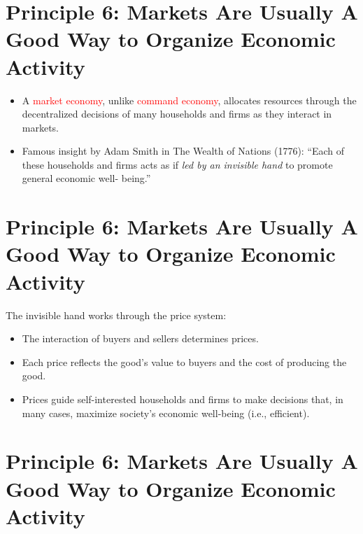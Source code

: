 \documentclass[
]{book}
\begin{document}
\hypertarget{principle-6-markets-are-usually-a-good-way-to-organize-economic-activity-1}{%
\section{Principle 6: Markets Are Usually A Good Way to Organize Economic Activity}\label{principle-6-markets-are-usually-a-good-way-to-organize-economic-activity-1}}

\begin{itemize}
\item
  A \textcolor{red}{market economy}, unlike \textcolor{red}{command economy}, allocates resources through the decentralized decisions of many households and firms as they interact in markets.
\item
  Famous insight by Adam Smith in The Wealth of Nations (1776): ``Each of these households and firms acts as if \emph{led by an invisible hand} to promote general economic well- being.''
\end{itemize}

\hypertarget{principle-6-markets-are-usually-a-good-way-to-organize-economic-activity-2}{%
\section{Principle 6: Markets Are Usually A Good Way to Organize Economic Activity}\label{principle-6-markets-are-usually-a-good-way-to-organize-economic-activity-2}}

The invisible hand works through the price system:

\begin{itemize}
\item
  The interaction of buyers and sellers determines prices.
\item
  Each price reflects the good's value to buyers and the cost of producing the good.
\item
  Prices guide self-interested households and firms to make decisions that, in many cases, maximize society's economic well-being (i.e., efficient).
\end{itemize}

\hypertarget{principle-6-markets-are-usually-a-good-way-to-organize-economic-activity-3}{%
\section{Principle 6: Markets Are Usually A Good Way to Organize Economic Activity}\label{principle-6-markets-are-usually-a-good-way-to-organize-economic-activity-3}}
\end{document}
